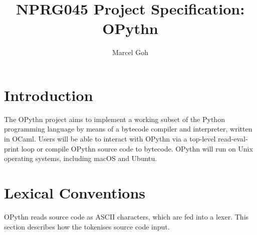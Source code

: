 \documentclass[11pt, twoside]{article}
\begin{document}
\title{\Huge{\textbf{NPRG045 Project Specification: OPythn}}}
\author{\Large{Marcel Goh}}
\clearpage\maketitle
\thispagestyle{empty}
\newpage
\setcounter{page}{1}

\section{Introduction}
    The OPythn project aims to implement a working subset of the Python programming language by means of a bytecode compiler and interpreter, written in OCaml. Users will be able to interact with OPythn via a top-level read-eval-print loop or compile OPythn source code to bytecode. OPythn will run on Unix operating systems, including macOS and Ubuntu.

\section{Lexical Conventions}
    OPythn reads source code as ASCII characters, which are fed into a lexer. This section describes how the tokenises source code input.
\end{document}
